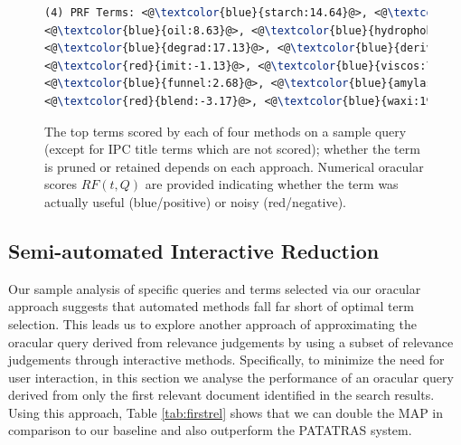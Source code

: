 \begin{figure}[htpb]
\begin{framed}
\begin{lstlisting}[basicstyle=\small\ttfamily , linewidth=\columnwidth,breaklines=true, language=TeX]
(4) PRF Terms: <@\textcolor{blue}{starch:14.64}@>, <@\textcolor{blue}{encapsul:17.50}@>, <@\textcolor{red}{chees:-4.22}@>, 
<@\textcolor{blue}{oil:8.63}@>, <@\textcolor{blue}{hydrophob:5.45}@>, <@\textcolor{blue}{agent:5.19}@>, <@\textcolor{red}{casein:-2.19}@>, 
<@\textcolor{blue}{degrad:17.13}@>, <@\textcolor{blue}{deriv:11.97}@>, <@\textcolor{blue}{tablet:5.30}@>, <@\textcolor{red}{debranch:-10.58}@>, 
<@\textcolor{red}{imit:-1.13}@>, <@\textcolor{blue}{viscos:7.77}@>, <@\textcolor{blue}{oxid:5.97}@>, <@\textcolor{blue}{activ:5.98}@>, <@\textcolor{blue}{osa:9.32}@>, 
<@\textcolor{blue}{funnel:2.68}@>, <@\textcolor{blue}{amylas:26.06}@>, <@\textcolor{red}{amylopectin:-7.14}@>, <@\textcolor{blue}{maiz:20.61}@>, 
<@\textcolor{red}{blend:-3.17}@>, <@\textcolor{blue}{waxi:19.41}@>, <@\textcolor{blue}{convert:31.81}@>, 

 \end{lstlisting} 
 \vspace*{-2ex}
\end{framed}
 \vspace*{-2ex}
  \caption{The top terms scored by each of four methods on a sample
    query (except for IPC title terms which are not scored); whether the term is
    pruned or retained depends on each approach.
    Numerical oracular scores $\mathit{RF}(t,Q)$ are provided
    indicating whether the term was actually useful (blue/positive) or
    noisy (red/negative).}
  \label{fig:anecdotal}  
\end{figure}
\FloatBarrier
\subsection{Semi-automated Interactive Reduction}
\label{sec:SemiAutomatedInteractiveReduction}
Our sample analysis of specific queries and terms selected via our oracular
approach suggests that automated methods fall far short of optimal term selection.
This leads us to explore another approach of approximating the oracular query
derived from relevance judgements by using a subset of relevance judgements
through interactive methods. Specifically, to minimize the need for user interaction,
in this section we analyse the performance of an oracular query derived from
only the first relevant document identified in the search results.
Using this approach, Table \ref{tab:firstrel} shows that we can double the MAP in comparison to our baseline and also outperform the PATATRAS system.

